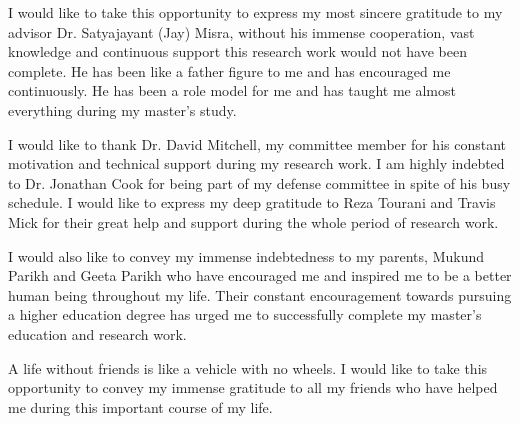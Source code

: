 I would like to take this opportunity to express my most sincere gratitude to my advisor Dr. Satyajayant (Jay) Misra, without his immense cooperation, vast knowledge and continuous support this research work would not have been complete. He has been like a father figure to me and has encouraged me continuously. He has been a role model for me and has taught me almost everything during my master’s study. \par
I would like to thank Dr. David Mitchell, my committee member for his constant motivation and technical support during my research work. I am highly indebted to Dr. Jonathan Cook for being part of my defense committee in spite of his busy schedule. I would like to express my deep gratitude to Reza Tourani and Travis Mick for their great help and support during the whole period of research work. \par
I would also like to convey my immense indebtedness to my parents, Mukund Parikh and Geeta Parikh who have encouraged me and inspired me to be a better human being throughout my life. Their constant encouragement towards pursuing a higher education degree has urged me to successfully complete my master’s education and research work. \par
A life without friends is like a vehicle with no wheels. I would like to take this opportunity to convey my immense gratitude to all my friends who have helped me during this important course of my life.\par

